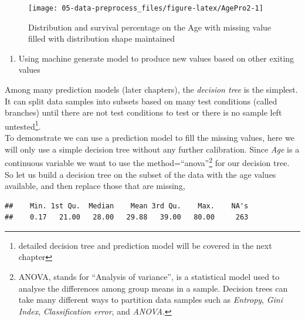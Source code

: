 \documentclass[
]{book}
\newenvironment{Shaded}{\begin{snugshade}}{\end{snugshade}}
\newcommand{\CommentTok}[1]{\textcolor[rgb]{0.56,0.35,0.01}{\textit{#1}}}
\newcommand{\KeywordTok}[1]{\textcolor[rgb]{0.13,0.29,0.53}{\textbf{#1}}}
\newcommand{\NormalTok}[1]{#1}
\newcommand{\OperatorTok}[1]{\textcolor[rgb]{0.81,0.36,0.00}{\textbf{#1}}}
\newcommand{\StringTok}[1]{\textcolor[rgb]{0.31,0.60,0.02}{#1}}
\providecommand{\tightlist}{%
  \setlength{\itemsep}{0pt}\setlength{\parskip}{0pt}}
\begin{document}
\begin{figure}

{\centering \texttt{[image: 05-data-preprocess\_files/figure-latex/AgePro2-1]} 

}

\caption{Distribution and survival percentage on the Age with missing value filled with distribution shape maintained}\label{fig:AgePro2}
\end{figure}

\begin{enumerate}
\def\labelenumi{\arabic{enumi}.}
\setcounter{enumi}{2}
\tightlist
\item
  Using machine generate model to produce new values based on other exiting values
\end{enumerate}

Among many prediction models (later chapters), the \emph{decision tree} is the simplest. It can split data samples into subsets based on many test conditions (called branches) until there are not test conditions to test or there is no sample left untested\footnote{detailed decision tree and prediction model will be covered in the next chapter}.\\
To demonstrate we can use a prediction model to fill the missing values, here we will only use a simple decision tree without any further calibration. Since \emph{Age} is a continuous variable we want to use the method=``anova''\footnote{ANOVA, stands for ``Analysis of variance'', is a statistical model used to analyse the differences among group means in a sample. Decision trees can take many different ways to partition data samples such as \emph{Entropy}, \emph{Gini Index}, \emph{Classification error}, and \emph{ANOVA}. } for our decision tree. So let us build a decision tree on the subset of the data with the age values available, and then replace those that are missing,

\begin{Shaded}
\end{Shaded}

\begin{verbatim}
##    Min. 1st Qu.  Median    Mean 3rd Qu.    Max.    NA's 
##    0.17   21.00   28.00   29.88   39.00   80.00     263
\end{verbatim}
\end{document}
